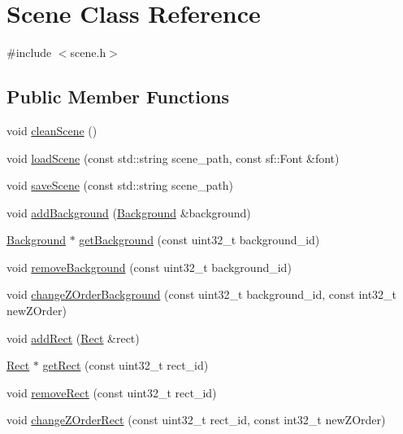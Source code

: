 \hypertarget{class_scene}{}\section{Scene Class Reference}
\label{class_scene}


{\ttfamily \#include $<$scene.\+h$>$}

\subsection*{Public Member Functions}
\begin{DoxyCompactItemize}
\item 
void \hyperlink{class_scene_a6c4a04bd6fb848a1bdf8d1a82792c1ef}{clean\+Scene} ()
\item 
void \hyperlink{class_scene_aca9bd4059c420909135294125b591682}{load\+Scene} (const std\+::string scene\+\_\+path, const sf\+::\+Font \&font)
\item 
void \hyperlink{class_scene_a70c218eb67b3507a56486e1dd945f095}{save\+Scene} (const std\+::string scene\+\_\+path)
\item 
void \hyperlink{class_scene_a07d6d13ed45e8882192bed7330e5383a}{add\+Background} (\hyperlink{class_background}{Background} \&background)
\item 
\hyperlink{class_background}{Background} $\ast$ \hyperlink{class_scene_ade83d8b5c8b13f12b11c9ef07507163d}{get\+Background} (const uint32\+\_\+t background\+\_\+id)
\item 
void \hyperlink{class_scene_a33e4cfa3d8433c5ccb8842ca65d85c70}{remove\+Background} (const uint32\+\_\+t background\+\_\+id)
\item 
void \hyperlink{class_scene_a95b1dd31805e0734f66fb9f131166fa4}{change\+Z\+Order\+Background} (const uint32\+\_\+t background\+\_\+id, const int32\+\_\+t new\+Z\+Order)
\item 
void \hyperlink{class_scene_a2ef42ab154353fa7881f9f7382f43b1f}{add\+Rect} (\hyperlink{class_rect}{Rect} \&rect)
\item 
\hyperlink{class_rect}{Rect} $\ast$ \hyperlink{class_scene_abff9132084e8edf5eee4f992233dc2e3}{get\+Rect} (const uint32\+\_\+t rect\+\_\+id)
\item 
void \hyperlink{class_scene_a1e0fa3c3898c30822e14fdaa963eaa62}{remove\+Rect} (const uint32\+\_\+t rect\+\_\+id)
\item 
void \hyperlink{class_scene_aee2976ddb158bde51704f40cf0266e10}{change\+Z\+Order\+Rect} (const uint32\+\_\+t rect\+\_\+id, const int32\+\_\+t new\+Z\+Order)

\end{DoxyCompactItemize}
